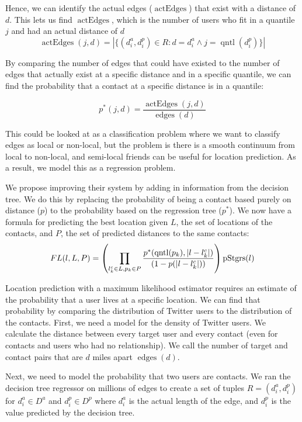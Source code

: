 \documentclass[letterpaper]{article}
\DeclareMathOperator{\pStrangers}{pStgrs}
\DeclareMathOperator{\edges}{edges}
\DeclareMathOperator{\actEdges}{actEdges}
\DeclareMathOperator{\quantile}{qntl}
\begin{document}
Hence, we can identify the actual edges ($\actEdges$) that exist with a distance of $d$. This lets us find $\actEdges$, which is the number of users who fit in a quantile $j$ and had an actual distance of $d$
\[
    \actEdges(j,d) = |\{
            (d^a_i,d^p_i) \in R :
            d=d^a_i \wedge j=\quantile(d^p_i)
        \}|
\]

By comparing the number of edges that could have existed to the number of edges that actually exist at a specific distance and in a specific quantile, we can find the probability that a contact at a specific distance is in a quantile:

\[
p^*(j,d) = \frac{\actEdges(j,d)}{\edges(d)}
\]

This could be looked at as a classification problem where we want to classify edges as local or non-local, but the problem is there is a smooth continuum from local to non-local, and semi-local friends can be useful for location prediction. As a result, we model this as a regression problem.




We propose improving their system by adding in information from the decision tree.
%
We do this by replacing the probability of being a contact based purely on distance ($p$) to the probability based on the regression tree ($p^*$).
%
We now have a formula for predicting the best location given $L$, the set of locations of the contacts, and $P$, the set of predicted distances to the same
contacts:
\[
    FL(l,L,P) =
        \left(
            \prod_{l^c_k \in L,p_k \in P}
            {p^*(\quantile(p_k),|l-l^c_k|) \over (1-p(|l-l^c_k|))}
        \right)
        \pStrangers(l)
\]

Location prediction with a maximum likelihood estimator requires an estimate of the probability that a user lives at a specific location. We can find that probability by comparing the distribution of Twitter users to the distribution of the contacts. First, we need a model for the density of Twitter users. We calculate the distance between every target user and every contact (even for contacts and users who had no relationship). We call the number of target and contact pairs that are $d$ miles apart $\edges(d)$.


Next, we need to model the probability that two users are contacts. We ran the decision tree regressor on millions of edges to create a set of
tuples $R = (d^a_i, d^p_i)$ for $d^a_i \in D^a$ and $d^p_i \in D^p$ where $d^a_i$ is the actual length of the edge, and $d^p_i$ is the value predicted by the decision tree. 
\end{document}
